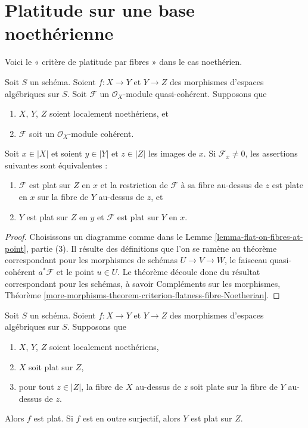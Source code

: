 \section{Platitude sur une base noethérienne}
\label{section-flat-over-Noetherian}

\noindent
Voici le « critère de platitude par fibres » dans le cas noethérien.

\begin{theorem}
\label{theorem-criterion-flatness-fibre-Noetherian}
Soit $S$ un schéma.
Soient $f : X \to Y$ et $Y \to Z$ des morphismes d'espaces algébriques sur $S$.
Soit $\mathcal{F}$ un $\mathcal{O}_X$-module quasi-cohérent.
Supposons que
\begin{enumerate}
\item $X$, $Y$, $Z$ soient localement noethériens, et
\item $\mathcal{F}$ soit un $\mathcal{O}_X$-module cohérent.
\end{enumerate}
Soit $x \in |X|$ et soient $y \in |Y|$ et $z \in |Z|$ les images de
$x$. Si $\mathcal{F}_{\overline{x}} \not = 0$, les assertions suivantes sont
équivalentes :
\begin{enumerate}
\item $\mathcal{F}$ est plat sur $Z$ en $x$ et
la restriction de $\mathcal{F}$ à sa fibre au-dessus de $z$
est plate en $x$ sur la fibre de $Y$ au-dessus de $z$, et
\item $Y$ est plat sur $Z$ en $y$ et $\mathcal{F}$ est
plat sur $Y$ en $x$.
\end{enumerate}
\end{theorem}

\begin{proof}
Choisissons un diagramme comme dans le
Lemme \ref{lemma-flat-on-fibres-at-point}, partie (3).
Il résulte des définitions que l'on se ramène au
théorème correspondant pour les morphismes de schémas
$U \to V \to W$, le faisceau quasi-cohérent $a^*\mathcal{F}$
et le point $u \in U$. Le théorème découle donc du
résultat correspondant pour les schémas, à savoir
Compléments sur les morphismes,
Théorème \ref{more-morphisms-theorem-criterion-flatness-fibre-Noetherian}.
\end{proof}

\begin{lemma}
\label{lemma-morphism-between-flat-Noetherian}
Soit $S$ un schéma.
Soient $f : X \to Y$ et $Y \to Z$ des morphismes d'espaces algébriques sur $S$.
Supposons que
\begin{enumerate}
\item $X$, $Y$, $Z$ soient localement noethériens,
\item $X$ soit plat sur $Z$,
\item pour tout $z \in |Z|$, la fibre de $X$ au-dessus de $z$
soit plate sur la fibre de $Y$ au-dessus de $z$.
\end{enumerate}
Alors $f$ est plat. Si $f$ est en outre surjectif, alors $Y$ est plat sur $Z$.
\end{lemma}

